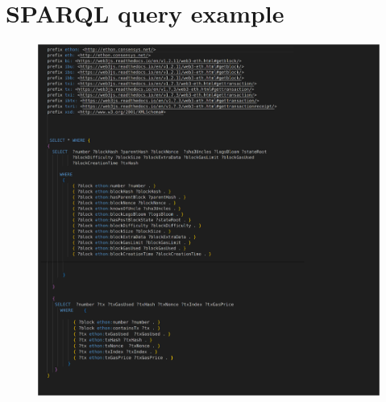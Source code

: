 
\chapter{SPARQL query example}
\begin{center}
	\begin{figure}[htb!]
		
		\begin{minipage}{0.43\linewidth}
			\centering
			\includegraphics[width=1.95\textwidth]{images/chap03_sparql_query_2.png}
		\end{minipage}
		
	\end{figure}
	
\end{center}